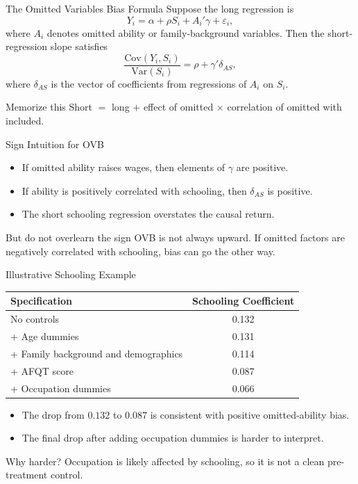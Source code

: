 \documentclass[11pt,aspectratio=169]{beamer}
\newcommand{\Var}{\mathrm{Var}}
\newcommand{\Cov}{\mathrm{Cov}}
\newcommand{\derivbutton}[1]{\vspace{0.4em}\hfill\hyperlink{app:#1}{\beamerbutton{Appendix details}}}
\begin{document}
\begin{frame}{The Omitted Variables Bias Formula}
  \hypertarget{main:ovb}{}
  Suppose the long regression is
  \[
    Y_i=\alpha+\rho S_i+A_i'\gamma+\varepsilon_i,
  \]
  where \(A_i\) denotes omitted ability or family-background variables.
  Then the short-regression slope satisfies
  \[
    \frac{\Cov(Y_i,S_i)}{\Var(S_i)}
    =
    \rho+\gamma'\delta_{AS},
  \]
  where \(\delta_{AS}\) is the vector of coefficients from regressions of \(A_i\) on \(S_i\).
  \begin{block}{Memorize this}
    Short \(=\) long \(+\) effect of omitted \(\times\) correlation of omitted with included.
  \end{block}
  \derivbutton{ovb-proof}
\end{frame}

\begin{frame}{Sign Intuition for OVB}
  \begin{itemize}
    \item If omitted ability raises wages, then elements of \(\gamma\) are positive.
    \item If ability is positively correlated with schooling, then \(\delta_{AS}\) is positive.
    \item The short schooling regression overstates the causal return.
  \end{itemize}
  \begin{block}{But do not overlearn the sign}
    OVB is not always upward. If omitted factors are negatively correlated with schooling, bias can go the other way.
  \end{block}
\end{frame}

\begin{frame}{Illustrative Schooling Example}
  \begin{center}
    \begin{tabular}{@{}lc@{}}
      \toprule
      Specification & Schooling Coefficient \\
      \midrule
      No controls & 0.132 \\
      + Age dummies & 0.131 \\
      + Family background and demographics & 0.114 \\
      + AFQT score & 0.087 \\
      + Occupation dummies & 0.066 \\
      \bottomrule
    \end{tabular}
  \end{center}
  \begin{itemize}
    \item The drop from \(0.132\) to \(0.087\) is consistent with positive omitted-ability bias.
    \item The final drop after adding occupation dummies is harder to interpret.
  \end{itemize}
  \begin{block}{Why harder?}
    Occupation is likely affected by schooling, so it is not a clean pre-treatment control.
  \end{block}
\end{frame}
\end{document}
